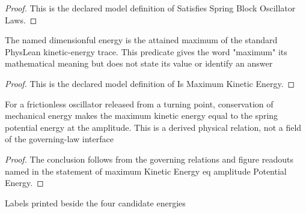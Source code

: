 \begin{proof}
  This is the declared model definition of Satisfies Spring Block Oscillator Laws.
\end{proof}
\begin{definition}
  \label{def:physics:phyx-mini-0280:phyxminiproblems-problemphyxmini0280-ismaximumkineticenergy}
  The named dimensionful energy is the attained maximum of the standard PhysLean kinetic-energy trace. This predicate gives the word "maximum" its mathematical meaning but does not state its value or identify an answer
\end{definition}
\begin{proof}
  This is the declared model definition of Is Maximum Kinetic Energy.
\end{proof}
\begin{lemma}
  \label{lem:physics:phyx-mini-0280:phyxminiproblems-problemphyxmini0280-maximumkineticenergy-eq-amplitudepotentialenergy}
  For a frictionless oscillator released from a turning point, conservation of mechanical energy makes the maximum kinetic energy equal to the spring potential energy at the amplitude. This is a derived physical relation, not a field of the governing-law interface
\end{lemma}
\begin{proof}
  The conclusion follows from the governing relations and figure readouts named in the statement of maximum Kinetic Energy eq amplitude Potential Energy.
\end{proof}
\begin{definition}
  \label{def:physics:phyx-mini-0280:phyxminiproblems-problemphyxmini0280-answerchoice}
  Labels printed beside the four candidate energies
\end{definition}
